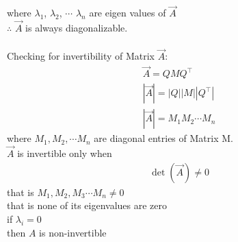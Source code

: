 \documentclass[journal]{IEEEtran}
\begin{document}
where $\lambda_1$, $\lambda_2$, $\cdots$ $\lambda_n$ are eigen values of $\vec{A}$\\
$\therefore$ $\vec{A}$ is always diagonalizable.\\\\
Checking for invertibility of Matrix  $\vec{A}$:
\begin{align}
\vec{A} = Q M Q^\top \\|\vec{A}| = |Q| |M| |Q^\top|\\
|\vec{A}| = M_1 M_2 \cdots M_n
\end{align}
where $M_1, M_2, \cdots M_n$ are diagonal entries of Matrix M.\\
$\vec{A}$ is invertible only when 
\begin{align}
\det(\vec{A}) \neq 0 
\end{align}
that is $M_1, M_2, M_3 \cdots M_n \neq 0$ \\
that is none of its eigenvalues are zero \\

if $\lambda_i = 0$ \\
then $A$ is non-invertible \\
\end{document}
